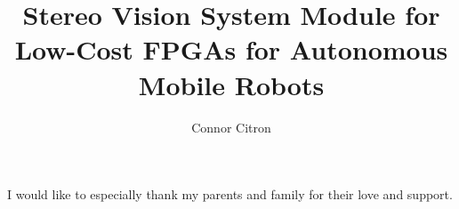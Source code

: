 \documentclass[12pt]{ucthesis}
\begin{document}

\title{Stereo Vision System Module for Low-Cost FPGAs for Autonomous Mobile Robots}
\author{Connor Citron}
  
 
     

\maketitle

\begin{frontmatter}

\copyrightpage

\committeemembershippage

\begin{abstract}



\end{abstract}

\begin{acknowledgements}

I would like to especially thank my parents and family for their love and support.

\end{acknowledgements}

\tableofcontents

\listoftables

\listoffigures

\end{frontmatter}

\pagestyle{plain}

\renewcommand{\baselinestretch}{1.66}




\end{document}
